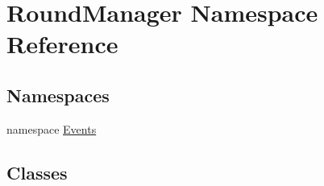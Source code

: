 \hypertarget{namespace_round_manager}{}\section{Round\+Manager Namespace Reference}
\label{namespace_round_manager}
\subsection*{Namespaces}
\begin{DoxyCompactItemize}
\item 
namespace \hyperlink{namespace_round_manager_1_1_events}{Events}
\end{DoxyCompactItemize}
\subsection*{Classes}

